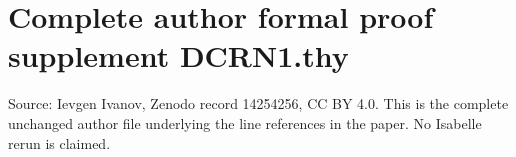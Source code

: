 \clearpage
\section*{Complete author formal proof supplement DCRN1.thy}
Source: Ievgen Ivanov, Zenodo record 14254256, CC BY 4.0. This is the complete unchanged author file underlying the line references in the paper. No Isabelle rerun is claimed.

